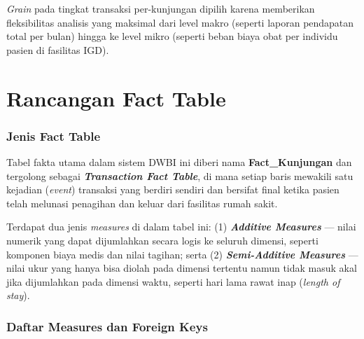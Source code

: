 \textit{Grain} pada tingkat transaksi per-kunjungan dipilih karena memberikan fleksibilitas analisis yang maksimal dari level makro (seperti laporan pendapatan total per bulan) hingga ke level mikro (seperti beban biaya obat per individu pasien di fasilitas IGD).
 
\section{Rancangan Fact Table}
 
\subsubsection{Jenis Fact Table}
 
Tabel fakta utama dalam sistem DWBI ini diberi nama \textbf{Fact\_Kunjungan} dan tergolong sebagai \textbf{\textit{Transaction Fact Table}}, di mana setiap baris mewakili satu kejadian (\textit{event}) transaksi yang berdiri sendiri dan bersifat final ketika pasien telah melunasi penagihan dan keluar dari fasilitas rumah sakit.
 
Terdapat dua jenis \textit{measures} di dalam tabel ini: (1) \textbf{\textit{Additive Measures}} --- nilai numerik yang dapat dijumlahkan secara logis ke seluruh dimensi, seperti komponen biaya medis dan nilai tagihan; serta (2) \textbf{\textit{Semi-Additive Measures}} --- nilai ukur yang hanya bisa diolah pada dimensi tertentu namun tidak masuk akal jika dijumlahkan pada dimensi waktu, seperti hari lama rawat inap (\textit{length of stay}).
 
\subsubsection{Daftar Measures dan Foreign Keys}
 
